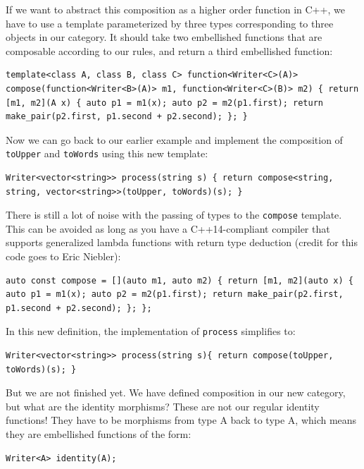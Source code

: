 If we want to abstract this composition as a higher order function in
C++, we have to use a template parameterized by three types
corresponding to three objects in our category. It should take two
embellished functions that are composable according to our rules, and
return a third embellished function:

\begin{verbatim}
template<class A, class B, class C> function<Writer<C>(A)> compose(function<Writer<B>(A)> m1, function<Writer<C>(B)> m2) { return [m1, m2](A x) { auto p1 = m1(x); auto p2 = m2(p1.first); return make_pair(p2.first, p1.second + p2.second); }; }
\end{verbatim}

Now we can go back to our earlier example and implement the composition
of \texttt{toUpper} and \texttt{toWords} using this new template:

\begin{verbatim}
Writer<vector<string>> process(string s) { return compose<string, string, vector<string>>(toUpper, toWords)(s); }
\end{verbatim}

There is still a lot of noise with the passing of types to the
\texttt{compose} template. This can be avoided as long as you have a
C++14-compliant compiler that supports generalized lambda functions with
return type deduction (credit for this code goes to Eric Niebler):

\begin{verbatim}
auto const compose = [](auto m1, auto m2) { return [m1, m2](auto x) { auto p1 = m1(x); auto p2 = m2(p1.first); return make_pair(p2.first, p1.second + p2.second); }; };
\end{verbatim}

In this new definition, the implementation of \texttt{process}
simplifies to:

\begin{verbatim}
Writer<vector<string>> process(string s){ return compose(toUpper, toWords)(s); }
\end{verbatim}

But we are not finished yet. We have defined composition in our new
category, but what are the identity morphisms? These are not our regular
identity functions! They have to be morphisms from type A back to type
A, which means they are embellished functions of the form:

\begin{verbatim}
Writer<A> identity(A);
\end{verbatim}

